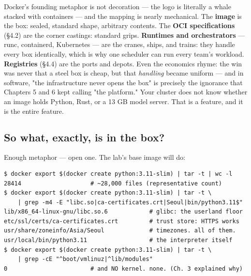 Docker's founding metaphor is not decoration — the logo is literally a whale stacked with containers — and the mapping is nearly mechanical. The \textbf{image} is the box: sealed, standard shape, arbitrary contents. The \textbf{OCI specifications} (§4.2) are the corner castings: standard grips. \textbf{Runtimes and orchestrators} — runc, containerd, Kubernetes — are the cranes, ships, and trains: they handle every box identically, which is why one scheduler can run every team's workload. \textbf{Registries} (§4.4) are the ports and depots. Even the economics rhyme: the win was never that a steel box is cheap, but that \textit{handling} became uniform — and in software, "the infrastructure never opens the box" is precisely the ignorance that Chapters 5 and 6 kept calling "the platform." Your cluster does not know whether an image holds Python, Rust, or a 13 GB model server. That is a feature, and it is the entire feature.

\subsection*{So what, exactly, is in the box?}

Enough metaphor — open one. The lab's base image will do:

\begin{terminalbox}
\begin{Verbatim}[breaklines=true,breakanywhere=true,fontsize=\small,formatcom=\color{tbbtermfg},codes=\tbbcodeactive]
$ docker export $(docker create python:3.11-slim) | tar -t | wc -l
28414                    # ~28,000 files (representative count)
$ docker export $(docker create python:3.11-slim) | tar -t \
    | grep -m4 -E "libc.so|ca-certificates.crt|Seoul|bin/python3.11$"
lib/x86_64-linux-gnu/libc.so.6            # glibc: the userland floor
etc/ssl/certs/ca-certificates.crt         # trust store: HTTPS works
usr/share/zoneinfo/Asia/Seoul             # timezones. all of them.
usr/local/bin/python3.11                  # the interpreter itself
$ docker export $(docker create python:3.11-slim) | tar -t \
    | grep -cE "^boot/vmlinuz|^lib/modules"
0                        # and NO kernel. none. (Ch. 3 explained why)
\end{Verbatim}
\end{terminalbox}


